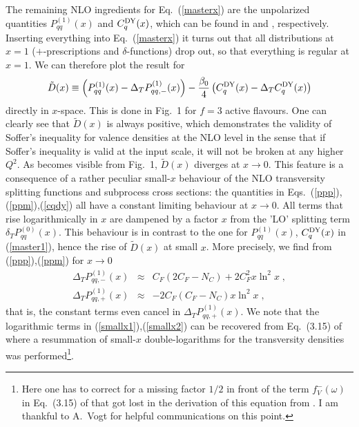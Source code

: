 The remaining NLO ingredients for Eq.~(\ref{masterx}) are 
the unpolarized quantities $P_{qq}^{(1)} (x)$ and $C_q^{{\small {\rm DY}}} 
(x)$, which can be found in \cite{cfp,ev} and \cite{aem}, respectively.
Inserting everything into Eq.~(\ref{masterx}) it turns out that all 
distributions at $x=1$ ($+$-prescriptions and $\delta$-functions) drop out,
so that everything is regular at $x=1$. We can therefore plot the result 
for 
\begin{equation} \label{master1}
\tilde{D} (x) \equiv \left( P_{qq}^{(1)} (x)-\Delta_T P_{qq,-}^{(1)} (x) 
\right) - \frac{\beta_0}{4} \left( C_q^{{\small {\rm DY}}} (x) - 
\Delta_T C_q^{{\small {\rm DY}}} (x) \right) 
\end{equation}
directly in $x$-space. This is done in Fig.~1 for $f=3$ active flavours.
One can clearly see that $\tilde{D}(x)$ is always positive, which  
demonstrates the validity of Soffer's inequality for valence densities 
at the NLO level in the sense that if Soffer's inequality is valid at the
input scale, it will not be broken at any higher $Q^2$. As becomes visible 
from Fig.~1, $\tilde{D}(x)$ diverges at $x\rightarrow 0$. 
This feature is a consequence of a rather peculiar small-$x$ behaviour 
of the NLO transversity splitting functions and subprocess cross sections: 
the quantities in Eqs.~(\ref{ppp}),(\ref{ppm}),(\ref{cqdy})
all have a constant limiting behaviour at $x\rightarrow 0$. All terms
that rise logarithmically in $x$ are dampened by a factor $x$ from the 'LO' 
splitting term $\delta_T P_{qq}^{(0)}(x)$. This behaviour is in contrast to
the one for $P_{qq}^{(1)} (x)$, $C_q^{{\small {\rm DY}}} (x)$ in
(\ref{master1}), hence the rise of $\tilde{D}(x)$ at small $x$. 
More precisely, we find from (\ref{ppp}),(\ref{ppm}) for $x\rightarrow 0$
\begin{eqnarray} \label{smallx1}
\Delta_T P_{qq,-}^{(1)} (x) &\approx& C_F \left( 2 C_F-N_C \right) + 
2 C_F^2 x \ln^2 x \; , \\ \label{smallx2}
\Delta_T P_{qq,+}^{(1)} (x) &\approx& -2 C_F \left( C_F-N_C \right)
x \ln^2 x \; , 
\end{eqnarray}
that is, the constant terms even cancel in $\Delta_T P_{qq,+}^{(1)} (x)$.
We note that the logarithmic terms in (\ref{smallx1}),(\ref{smallx2}) can be 
recovered from Eq.~(3.15) of \cite{kmss} where a resummation of 
small-$x$ double-logarithms for the transversity densities was 
performed\footnote{Here one has to correct for a missing factor
$1/2$ in front of the term $f_V^-(\omega)$ in Eq.~(3.15) of \cite{kmss}
that got lost in the derivation of this equation from \cite{kold}.
I am thankful to A.\ Vogt for helpful communications on this point.}.
